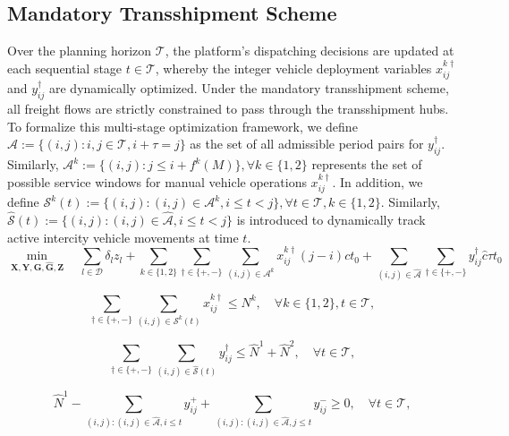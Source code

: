 \documentclass[10pt, reqno]{amsart}
\begin{document}
\subsection{Mandatory Transshipment Scheme}\label{subsec:mandatory}
Over the planning horizon $\mathcal{T}$, the platform's dispatching decisions are updated at each sequential stage $t \in \mathcal{T}$, whereby the integer vehicle deployment variables $x_{ij}^{k\dagger}$ and $y_{ij}^{\dagger}$ are dynamically optimized. Under the mandatory transshipment scheme, all freight flows are strictly constrained to pass through the transshipment hubs. To formalize this multi-stage optimization framework, we define $\hat{\mathcal{A}} := \{(i,j) : i,j \in \mathcal{T}, i+\tau=j\}$ as the set of all admissible period pairs for $y_{ij}^{\dagger}$. Similarly, $\mathcal{A}^k := \{(i,j) : j \le i+f^k(M)\}, \forall k \in \{1,2\}$ represents the set of possible service windows for manual vehicle operations $x_{ij}^{k\dagger}$. In addition, we define $\mathcal{S}^k(t) := \{(i,j) : (i,j) \in \mathcal{A}^k, i \le t < j\}, \forall t \in \mathcal{T}, k \in \{1,2\}$. Similarly, $\hat{\mathcal{S}}(t) := \{(i,j) : (i,j) \in \hat{\mathcal{A}}, i \le t < j\}$ is introduced to dynamically track active intercity vehicle movements at time $t$.
\begin{equation}
\min_{\mathbf{X}, \mathbf{Y}, \mathbf{G}, \hat{\mathbf{G}}, \mathbf{Z}} \quad \sum_{l \in \mathcal{D}} \delta_l z_l + \sum_{k \in \{1,2\}} \sum_{\dagger \in \{+,-\}} \sum_{(i,j) \in \mathcal{A}^{k}} x_{ij}^{k\dagger} (j-i) c t_0 + \sum_{(i,j) \in \hat{\mathcal{A}}} \sum_{\dagger \in \{+,-\}} y_{ij}^{\dagger} \hat{c} \tau t_0\label{eq:obj}
\end{equation}

\noindent {}
\begin{equation}
\sum_{\dagger \in \{+,-\}} \sum_{(i,j) \in \mathcal{S}^k(t)} x_{ij}^{k\dagger} \le N^k, \quad \forall k \in \{1,2\}, t \in \mathcal{T},\label{eq:num man veh}
\end{equation}

\begin{equation}
\sum_{\dagger \in \{+,-\}} \sum_{(i,j) \in \hat{\mathcal{S}}(t)} y_{ij}^{\dagger} \le \hat{N}^1 + \hat{N}^2, \quad \forall t \in \mathcal{T},\label{num auto veh}
\end{equation}

\begin{equation}
 \hat{N}^1-\sum_{(i,j) : (i,j) \in \hat{\mathcal{A}}, i \le t} y_{ij}^+ + \sum_{(i,j) : (i,j) \in \hat{\mathcal{A}}, j \le t} y_{ij}^- \ge 0, \quad \forall t \in \mathcal{T},\label{bal auto +}
\end{equation}
\end{document}
